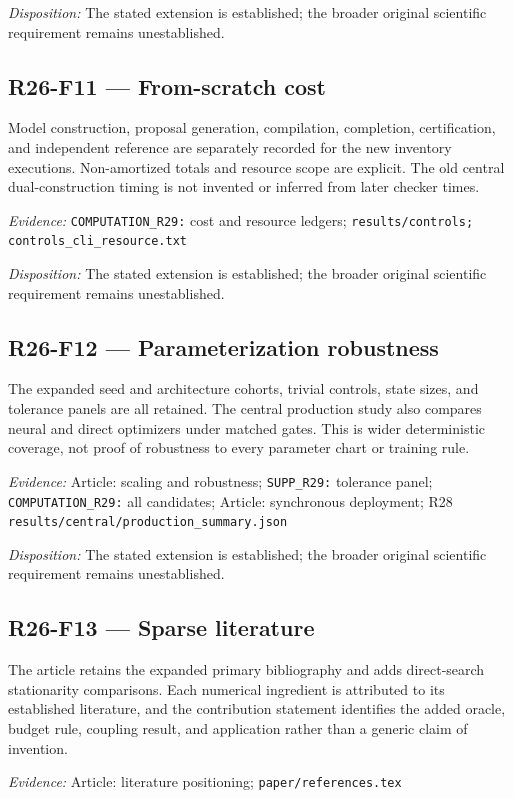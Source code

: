 \emph{Disposition:} The stated extension is established; the broader original scientific requirement remains unestablished.
\subsection{R26-F11 --- From-scratch cost}
Model construction, proposal generation, compilation, completion, certification, and independent reference are separately recorded for the new inventory executions. Non-amortized totals and resource scope are explicit. The old central dual-construction timing is not invented or inferred from later checker times.

\emph{Evidence:} \nolinkurl{COMPUTATION_R29:} cost and resource ledgers; \nolinkurl{results/controls;} \nolinkurl{controls_cli_resource.txt}

\emph{Disposition:} The stated extension is established; the broader original scientific requirement remains unestablished.
\subsection{R26-F12 --- Parameterization robustness}
The expanded seed and architecture cohorts, trivial controls, state sizes, and tolerance panels are all retained. The central production study also compares neural and direct optimizers under matched gates. This is wider deterministic coverage, not proof of robustness to every parameter chart or training rule.

\emph{Evidence:} Article: scaling and robustness; \nolinkurl{SUPP_R29:} tolerance panel; \nolinkurl{COMPUTATION_R29:} all candidates; Article: synchronous deployment; R28 \nolinkurl{results/central/production_summary.json}

\emph{Disposition:} The stated extension is established; the broader original scientific requirement remains unestablished.
\subsection{R26-F13 --- Sparse literature}
The article retains the expanded primary bibliography and adds direct-search stationarity comparisons. Each numerical ingredient is attributed to its established literature, and the contribution statement identifies the added oracle, budget rule, coupling result, and application rather than a generic claim of invention.

\emph{Evidence:} Article: literature positioning; \nolinkurl{paper/references.tex}

